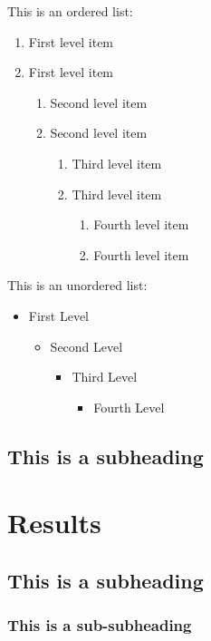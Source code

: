 \documentclass[paper=a4,fontsize=11pt,twocolumn]{article}
\begin{document}
This is an ordered list:
\begin{enumerate}
   \item First level item
   \item First level item
   \begin{enumerate}
     \item Second level item
     \item Second level item
     \begin{enumerate}
       \item Third level item
       \item Third level item
       \begin{enumerate}
         \item Fourth level item
         \item Fourth level item
       \end{enumerate}
     \end{enumerate}
   \end{enumerate}
 \end{enumerate}

This is an unordered list:
 \begin{itemize}
   \item  First Level
   \begin{itemize}
     \item  Second Level
     \begin{itemize}
       \item  Third Level
       \begin{itemize}
         \item  Fourth Level
       \end{itemize}
     \end{itemize}
   \end{itemize}
 \end{itemize}

\subsection{This is a subheading}
\lipsum[10-11]
\cite {Burns1981}

\section{Results}
\subsection{This is a subheading}
\subsubsection{This is a sub-subheading}
\end{document}
